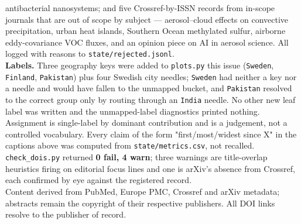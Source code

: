 \documentclass[10pt]{article}
\begin{document}
\begin{keybox}
{antibacterial nanosystems; and five Crossref-by-ISSN records from in-scope journals that are
out of scope by subject --- aerosol--cloud effects on convective precipitation, urban heat
islands, Southern Ocean methylated sulfur, airborne eddy-covariance VOC fluxes, and an
opinion piece on AI in aerosol science. All logged with reasons to
\texttt{state/rejected.jsonl}.\\[0.8mm]
\textbf{Labels.} Three geography keys were added to \texttt{plots.py} this issue
(\texttt{Sweden}, \texttt{Finland}, \texttt{Pakistan}) plus four Swedish city needles;
\texttt{Sweden} had neither a key nor a needle and would have fallen to the unmapped bucket,
and \texttt{Pakistan} resolved to the correct group only by routing through an
\texttt{India} needle. No other new leaf label was written and the unmapped-label
diagnostics printed nothing. Assignment is single-label by dominant contribution and is a
judgement, not a controlled vocabulary. Every claim of the form "first/most/widest since X"
in the captions above was computed from \texttt{state/metrics.csv}, not recalled.
\texttt{check\_dois.py} returned \textbf{0 fail, 4 warn}; three warnings are title-overlap
heuristics firing on editorial focus lines and one is arXiv's absence from Crossref, each
confirmed by eye against the registered record.\\[0.8mm]
Content derived from PubMed, Europe PMC, Crossref and arXiv metadata; abstracts remain the
copyright of their respective publishers. All DOI links resolve to the publisher of record.\par}
\end{keybox}
\end{document}

